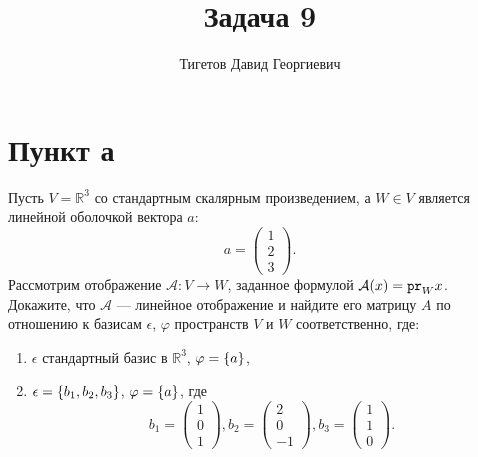\documentclass[12pt]{article}
\begin{document}
    \title{Задача 9}
    \author{Тигетов Давид Георгиевич}
    \date{}
    \maketitle

    \section*{Пункт а}
    Пусть $V = \mathbb{R}^3$ со стандартным скалярным произведением, а $W \in V$ является линейной оболочкой вектора $a$:
    \[
        a = \begin{pmatrix}
                1 \\ 2 \\ 3
        \end{pmatrix} .
    \]
    Рассмотрим отображение $\mathcal{A}: V \rightarrow W$, заданное формулой $\mathcal{A}(x) = \texttt{pr}_{W} {x}$. Докажите, что $\mathcal{A}$ --- линейное отображение и найдите его
    матрицу $A$ по отношению к базисам $\epsilon$, $\varphi$ пространств $V$ и $W$ соответственно, где:
    \begin{enumerate}
        \item $\epsilon$ стандартный базис в $\mathbb{R}^3$, $\varphi = \left \{ a \right \}$,
        \item $\epsilon = \left \{ b_1, b_2, b_3 \right \}$, $\varphi = \left \{ a \right \}$, где
        \[
            b_1 = \begin{pmatrix}
                      1 \\ 0 \\ 1
            \end{pmatrix} ,
            b_2 = \begin{pmatrix}
                      2 \\ 0 \\ -1
            \end{pmatrix} ,
            b_3 = \begin{pmatrix}
                      1 \\ 1 \\ 0
            \end{pmatrix} .
        \]
    \end{enumerate}
\end{document}
